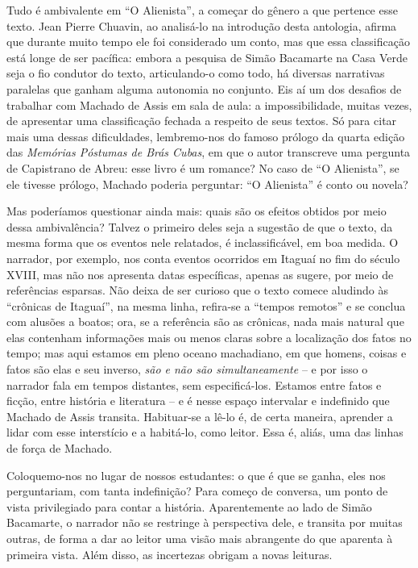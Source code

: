 \documentclass{extarticle}
\begin{document}
Tudo é ambivalente em ``O Alienista'', a começar do gênero a que
pertence esse texto. Jean Pierre Chuavin, ao analisá-lo na introdução
desta antologia, afirma que durante muito tempo ele foi considerado um
conto, mas que essa classificação está longe de ser pacífica: embora a
pesquisa de Simão Bacamarte na Casa Verde seja o fio condutor do texto,
articulando-o como todo, há diversas narrativas paralelas que ganham
alguma autonomia no conjunto. Eis aí um dos desafios de trabalhar com
Machado de Assis em sala de aula: a impossibilidade, muitas vezes, de
apresentar uma classificação fechada a respeito de seus textos. Só para
citar mais uma dessas dificuldades, lembremo-nos do famoso prólogo da
quarta edição das \emph{Memórias Póstumas de Brás Cubas}, em que o autor
transcreve uma pergunta de Capistrano de Abreu: esse livro é um romance?
No caso de ``O Alienista'', se ele tivesse prólogo, Machado poderia
perguntar: ``O Alienista'' é conto ou novela?

Mas poderíamos questionar ainda mais: quais são os efeitos obtidos por
meio dessa ambivalência? Talvez o primeiro deles seja a sugestão de que
o texto, da mesma forma que os eventos nele relatados, é
inclassificável, em boa medida. O narrador, por exemplo, nos conta
eventos ocorridos em Itaguaí no fim do século XVIII, mas não nos
apresenta datas específicas, apenas as sugere, por meio de referências
esparsas. Não deixa de ser curioso que o texto comece aludindo às
``crônicas de Itaguaí'', na mesma linha, refira-se a ``tempos remotos''
e se conclua com alusões a boatos; ora, se a referência são as crônicas,
nada mais natural que elas contenham informações mais ou menos claras
sobre a localização dos fatos no tempo; mas aqui estamos em pleno oceano
machadiano, em que homens, coisas e fatos são elas e seu inverso,
\emph{são e não são simultaneamente} -- e por isso o narrador fala em
tempos distantes, sem especificá-los. Estamos entre fatos e ficção,
entre história e literatura -- e é nesse espaço intervalar e indefinido
que Machado de Assis transita. Habituar-se a lê-lo é, de certa maneira,
aprender a lidar com esse interstício e a habitá-lo, como leitor. Essa
é, aliás, uma das linhas de força de Machado.

Coloquemo-nos no lugar de nossos estudantes: o que é que se ganha, eles
nos perguntariam, com tanta indefinição? Para começo de conversa, um
ponto de vista privilegiado para contar a história. Aparentemente ao
lado de Simão Bacamarte, o narrador não se restringe à perspectiva dele,
e transita por muitas outras, de forma a dar ao leitor uma visão mais
abrangente do que aparenta à primeira vista. Além disso, as incertezas
obrigam a novas leituras.
\end{document}
